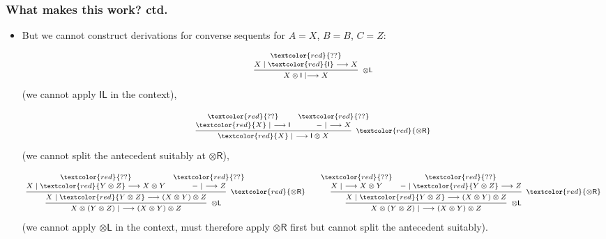 \documentclass[10pt,t]{beamer}
\newcommand{\red}[1]{\textcolor{red}{#1}}
\newcommand{\I}{\mathsf{I}}
\newcommand{\ot}{\otimes}
\newcommand{\n}{{-}}
\newcommand{\IL}{\I\mathsf{L}}
\newcommand{\otL}{\ot\mathsf{L}}
\newcommand{\otR}{\ot\mathsf{R}}
\renewcommand{\vdash}{\longrightarrow}
\begin{document}
\begin{frame}

\frametitle{What makes this work? ctd.}

\begin{itemize}

\item But we cannot construct derivations for converse sequents for
  $A = X$, $B = B$, $C = Z$:

\[
\scriptsize
\infer[\otL]{X \ot \I \mid \vdash X}{
  \deduce{X \mid \red{\I} \vdash X}{
    \red{??}
  }
}
\]
(we cannot apply $\IL$ in the context),

\medskip

\[
\scriptsize
\infer[\red{\otR}]{\red{X} \mid ~\vdash \I \ot X}{
  \deduce[\red{??}]{\red{X} \mid ~ \vdash \I}{
  }
  &
  \deduce[\red{??}]{\n \mid ~ \vdash X}{
  }
}
\]
(we cannot split the antecedent suitably at $\otR$),

\medskip

\[
\scriptsize
\infer[\otL]{X \ot (Y \ot Z) \mid ~\vdash (X \ot Y) \ot Z}{
  \infer[\red{\otR}]{X \mid \red{Y \ot Z} \vdash (X \ot Y) \ot Z}{
   \deduce[\red{??}]{X \mid \red{Y \ot Z} \vdash X \ot Y}{
   }
   &
   \deduce[\red{??}]{\n \mid ~ \vdash  Z}{
   }
 }
}
\qquad
\infer[\otL]{X \ot (Y \ot Z) \mid ~ \vdash (X \ot Y) \ot Z}{
  \infer[\red{\otR}]{X \mid \red{Y \ot Z} \vdash (X \ot Y) \ot Z}{
   \deduce[\red{??}]{X \mid ~ \vdash X \ot Y}{
   }
   &
   \deduce[\red{??}]{\n \mid \red{Y \ot Z} \vdash Z}{
   }
 }
}
\]
(we cannot apply $\otL$ in the context, must therefore apply $\otR$
first but cannot split the antecedent suitably).

\end{itemize}

\end{frame}
\end{document}
